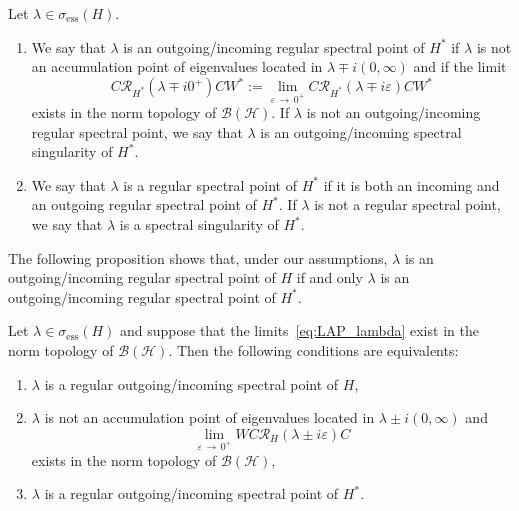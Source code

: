 \documentclass[AHL,Unicode,longabstracts,published]{cedram}
\newcommand{\Hi}{\mathcal{H}}
\newcommand{\ess}{\mathrm{ess}}
\newcommand{\Res}{\mathcal{R}}
\newcommand{\clB}{\mathcal{B}}
\newcommand*{\romanenumi}{\renewcommand*{\theenumi}{\roman{enumi}}}
\newcommand{\Hi}{\mathcal{H}}
\newcommand{\ess}{\mathrm{ess}}
\begin{document}
\begin{defi}\label{def:point_spectral_regulier_classique_pour_H_star}
Let $\lambda\in\sigma_\ess(H)$.
\begin{enumerate}\romanenumi
\item\label{defi4.4.1} We say that $\lambda$ is an outgoing/incoming regular spectral point of $H^*$ if $\lambda$ is not an accumulation point of eigenvalues located in $\lambda\mp i\left(0,\infty\right)$ and if the limit
\begin{equation}\label{eq:def_reg_spec_pt_H_Star}
C\Res_{H^*}(\lambda\mp i0^+)CW^*:=\lim_{\varepsilon\,\rightarrow\,0^+} C\Res_{H^*}(\lambda\mp i\varepsilon)CW^*
\end{equation}
exists in the norm topology of $\clB(\Hi)$. If $\lambda$ is not an outgoing/incoming regular spectral point, we say that $\lambda$ is an outgoing/incoming spectral singularity of $H^*$.
\item\label{defi4.4.2} We say that $\lambda$ is a regular spectral point of $H^*$ if it is both an incoming and an outgoing regular spectral point of $H^*$. If $\lambda$ is not a regular spectral point, we say that $\lambda$ is a spectral singularity of $H^*$.
\end{enumerate}
\end{defi}

The following proposition shows that, under our assumptions, $\lambda$ is an outgoing/incoming regular spectral point of $H$ if and only $\lambda$ is an outgoing/incoming regular spectral point of $H^*$.

\begin{prop}
Let $\lambda\in\sigma_\ess(H)$ and suppose that the limits~\eqref{eq:LAP_lambda} exist in the norm topology of $\clB(\Hi)$. Then the following conditions are equivalents:
\begin{enumerate}\romanenumi
\item\label{it:a1}
$\lambda$ is a regular outgoing/incoming spectral point of $H$,
\item\label{it:a2}
$\lambda$ is not an accumulation point of eigenvalues located in $\lambda \pm i(0,\infty)$ and
\begin{equation*}
\lim_{\varepsilon\,\rightarrow\,0^+} WC\Res_H(\lambda\pm i\varepsilon)C
\end{equation*}
exists in the norm topology of $\clB(\Hi)$,
\item\label{it:a3}
$\lambda$ is a regular outgoing/incoming spectral point of $H^*$.
\end{enumerate}
\end{prop}
\end{document}

